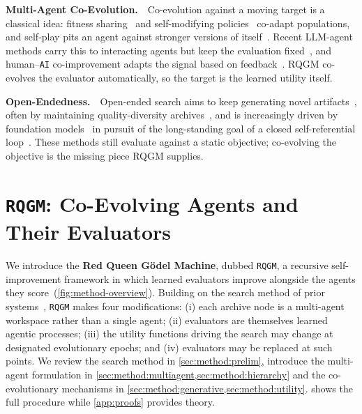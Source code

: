 \documentclass{paper}
\newcommand{\ourmethod}{\texttt{RQGM}\xspace}
\newcommand{\AI}{\texttt{AI}}
\begin{document}
\noindent\textbf{Multi-Agent Co-Evolution.}~~Co-evolution against a moving target is a classical idea: fitness sharing~\citep{rosin1997new} and self-modifying policies~\citep{schmidhuber1996multi} co-adapt populations, and self-play pits an agent against stronger versions of itself~\citep{silver2016mastering,silver2018general}. Recent LLM-agent methods carry this to interacting agents but keep the evaluation fixed~\citep{chen2025multi,weng2026group}, and human--\AI{} co-improvement adapts the signal based on feedback~\citep{weston2025ai}. RQGM co-evolves the evaluator automatically, so the target is the learned utility itself.

\noindent\textbf{Open-Endedness.}~~Open-ended search aims to keep generating novel artifacts~\citep{stanley2017open,hughes2024open}, often by maintaining quality-diversity archives~\citep{mouret2015illuminating,ecoffet2019go}, and is increasingly driven by foundation models~\citep{huautomated,lu2024ai,novikov2025alphaevolve} in pursuit of the long-standing goal of a closed self-referential loop~\citep{clune2019ai}. These methods still evaluate against a static objective; co-evolving the objective is the missing piece RQGM supplies.


\section{\ourmethod: Co-Evolving Agents and Their Evaluators}
\label{sec:method}

We introduce the \textbf{Red Queen G\"odel Machine}, dubbed \ourmethod, a recursive self-improvement framework in which learned evaluators improve alongside the agents they score~(\cref{fig:method-overview}). Building on the search method of prior systems~\citep{zhang2025darwin,wang2025huxley,zhang2026hyperagents}, \ourmethod makes four modifications: (i) each archive node is a multi-agent workspace rather than a single agent; (ii) evaluators are themselves learned agentic processes; (iii) the utility functions driving the search may change at designated evolutionary epochs; and (iv) evaluators may be replaced at such points. We review the search method in \cref{sec:method:prelim}, introduce the multi-agent formulation in \cref{sec:method:multiagent,sec:method:hierarchy} and the co-evolutionary mechanisms in \cref{sec:method:generative,sec:method:utility}.  shows the full procedure while \cref{app:proofs} provides theory.
\end{document}
